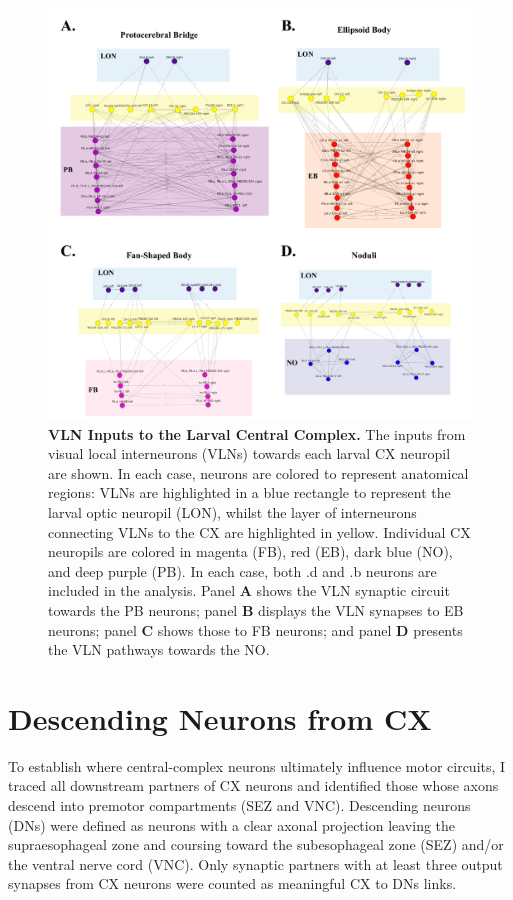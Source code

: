     \begin{figure}[H]
        \centering
        \includegraphics[width=15cm]{Figs/CX/VLNstoCX.pdf}
        \caption[Visual Inputs via VLNs to larval Central Complex Neuropils]{\textbf{VLN Inputs to the Larval Central Complex.} The inputs from visual local interneurons (VLNs) towards each larval CX neuropil are shown. In each case, neurons are colored to represent anatomical regions: VLNs are highlighted in a blue rectangle to represent the larval optic neuropil (LON), whilst the layer of interneurons connecting VLNs to the CX are highlighted in yellow. Individual CX neuropils are colored in magenta (FB), red (EB), dark blue (NO), and deep purple (PB). In each case, both .d and .b neurons are included in the analysis. Panel \textbf{A} shows the VLN synaptic circuit towards the PB neurons; panel \textbf{B} displays the VLN synapses to EB neurons; panel \textbf{C} shows those to FB neurons; and panel \textbf{D} presents the VLN pathways towards the NO.}
        \label{VLNs}
    \end{figure}

 \section{Descending Neurons from CX}    
 \label{CXDescendingsection}
    To establish where central-complex neurons ultimately influence motor circuits, I traced all downstream partners of CX neurons and identified those whose axons descend into premotor compartments (SEZ and VNC). Descending neurons (DNs) were defined as neurons with a clear axonal projection leaving the supraesophageal zone and coursing toward the subesophageal zone (SEZ) and/or the ventral nerve cord (VNC). Only synaptic partners with at least three output synapses from CX neurons were counted as meaningful CX to DNs links. 

